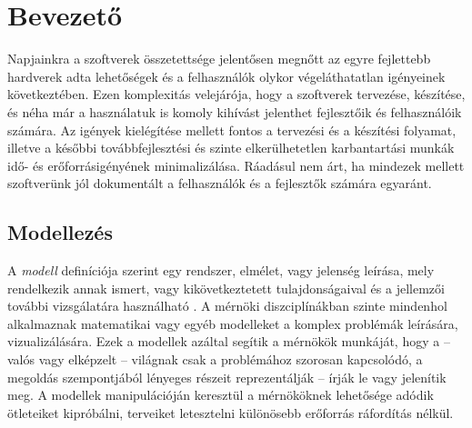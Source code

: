 \chapter{Bevezető}%


Napjainkra a szoftverek összetettsége jelentősen megnőtt az egyre fejlettebb hardverek adta lehetőségek és a felhasználók olykor végeláthatatlan igényeinek következtében.
Ezen komplexitás velejárója, hogy a szoftverek tervezése, készítése, és néha már a használatuk is komoly kihívást jelenthet fejlesztőik és felhasználóik számára.
Az igények kielégítése mellett fontos a tervezési és a készítési folyamat, illetve a későbbi továbbfejlesztési és szinte elkerülhetetlen karbantartási munkák idő- és erőforrásigényének minimalizálása.
Ráadásul nem árt, ha mindezek mellett szoftverünk jól dokumentált a felhasználók és a fejlesztők számára egyaránt.  

\section{Modellezés}

A \emph{modell} definíciója szerint egy rendszer, elmélet, vagy jelenség leírása, mely rendelkezik annak ismert, vagy kikövetkeztetett tulajdonságaival és a jellemzői további vizsgálatára használható \cite{dict:Model}.
A mérnöki diszciplínákban szinte mindenhol alkalmaznak matematikai vagy egyéb modelleket a komplex problémák leírására, vizualizálására.
Ezek a modellek azáltal segítik a mérnökök munkáját, hogy a -- valós vagy elképzelt -- világnak csak a problémához szorosan kapcsolódó, a megoldás szempontjából lényeges részeit reprezentálják -- írják le vagy jelenítik meg.
A modellek manipulációján keresztül a mérnököknek lehetősége adódik ötleteiket kipróbálni, terveiket letesztelni különösebb erőforrás ráfordítás nélkül.

